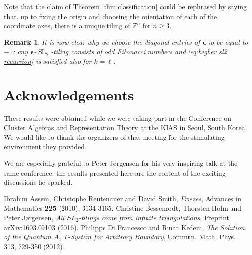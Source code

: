 \documentclass[12pt]{amsart}
\newtheorem{remark}[theorem]{Remark}
\newcommand{\bepsilon}{\boldsymbol{\epsilon}}
\newcommand{\SL}{\operatorname{SL}}
\newcommand{\ZZ}{\mathbb{Z}}
\begin{document}
  Note that the claim of Theorem \ref{thm:classification} could be rephrased by saying that, up to fixing the origin and choosing the orientation of each of the coordinate axes, there is a unique tiling of $\ZZ^n$ for $n\ge3$.

  \begin{remark}
    It is now clear why we choose the diagonal entries of $\bepsilon$ to be equal to $-1$: any $\bepsilon$-$\SL_2$-tiling consists of odd Fibonacci numbers and \eqref{eq:higher sl2 recursion} is satisfied also for $k=\ell$.
  \end{remark}

\section*{Acknowledgements}
  These results were obtained while we were taking part in the Conference on Cluster Algebras and Representation Theory at the KIAS in Seoul, South Korea.
  We would like to thank the organizers of that meeting for the stimulating environment they provided.

  We are especially grateful to Peter J\o rgensen for his very inspiring talk at the same conference: the results presented here are the content of the exciting discussions he sparked.

\begin{thebibliography}{99}
   Ibrahim Assem, Christophe Reutenauer and David Smith, \emph{Friezes}, Advances in Mathematics {\bf 225} (2010), 3134-3165.
   Christine Bessenrodt, Thorsten Holm and Peter J{\o}rgensen, \emph{All $SL_2$-tilings come from infinite triangulations}, Preprint arXiv:1603.09103 (2016).
   Philippe Di Francesco and Rinat Kedem, \emph{The Solution of the Quantum $A_1$ $T$-System for Arbitrary Boundary}, Commun. Math. Phys. 313, 329-350 (2012).
\end{thebibliography}
\end{document}

